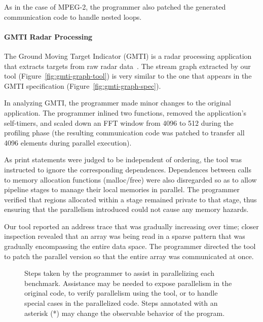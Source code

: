 As in the case of MPEG-2, the programmer also patched the generated
communication code to handle nested loops.

\paragraph*{GMTI Radar Processing} The Ground Moving Target Indicator (GMTI)
is a radar processing application that extracts targets from raw radar
data~\cite{reuther03gmti}.  The stream graph extracted by our tool
(Figure~\ref{fig:gmti-graph-tool}) is very similar to the one that
appears in the GMTI specification (Figure~\ref{fig:gmti-graph-spec}).

In analyzing GMTI, the programmer made minor changes to the original
application.  The programmer inlined two functions, removed the
application's self-timers, and scaled down an FFT window from 4096 to
512 during the profiling phase (the resulting communication code was
patched to transfer all 4096 elements during parallel execution).  

As print statements were judged to be independent of ordering, the
tool was instructed to ignore the corresponding dependences.
Dependences between calls to memory allocation functions (malloc/free)
were also disregarded so as to allow pipeline stages to manage their
local memories in parallel.  The programmer verified that regions
allocated within a stage remained private to that stage, thus ensuring
that the parallelism introduced could not cause any memory hazards.

Our tool reported an address trace that was gradually increasing over
time; closer inspection revealed that an array was being read in a
sparse pattern that was gradually encompassing the entire data space.
The programmer directed the tool to patch the parallel version so that
the entire array was communicated at once.

\begin{figure*}[t]
\hspace{-0.25in}
\caption[Steps taken by programmer to assist with
  parallelization]{Steps taken by the programmer to assist in
  parallelizing each benchmark.  Assistance may be needed to expose
  parallelism in the original code, to verify parallelism using the
  tool, or to handle special cases in the parallelized code.  Steps
  annotated with an asterisk (*) may change the observable behavior of
  the program\protect\footnotemark[1].
  \protect\label{fig:program-changes}}
\end{figure*}

